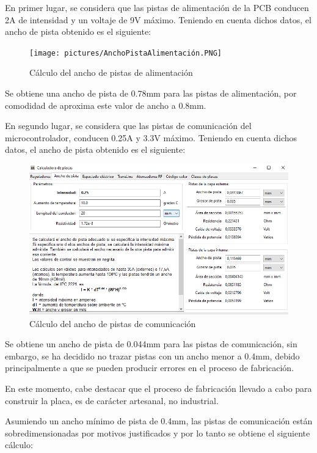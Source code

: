 En primer lugar, se considera que las pistas de alimentación de la PCB conducen 2A de intensidad y un voltaje de 9V máximo. Teniendo en cuenta dichos datos, el ancho de pista obtenido es el siguiente:

\begin{figure}[H]
\centering 
\texttt{[image: pictures/AnchoPistaAlimentación.PNG]}
\caption{Cálculo del ancho de pistas de alimentación}
\label{fig:kdiagram}
\end{figure}
 
 Se obtiene una ancho de pista de 0.78mm para las pistas de alimentación, por comodidad de aproxima este valor de ancho a 0.8mm.
 
 En segundo lugar, se considera que las pistas de comunicación del microcontrolador, conducen 0.25A y 3.3V máximo. Teniendo en cuenta dichos datos, el ancho de pista obtenido es el siguiente:
 
\begin{figure}[H]
\centering 
\includegraphics[width=0.9\linewidth]{pictures/AnchoPistaRestoMinimo.PNG}
\caption{Cálculo del ancho de pistas de comunicación}
\label{fig:kdiagram}
\end{figure}

Se obtiene un ancho de pista de 0.044mm para las pistas de comunicación, sin embargo, se ha decidido no trazar pistas con un ancho menor a 0.4mm, debido principalmente a que se pueden producir errores en el proceso de fabricación.

En este momento, cabe destacar que el proceso de fabricación llevado a cabo para construir la placa, es de carácter artesanal, no industrial.

Asumiendo un ancho mínimo de pista de 0.4mm, las pistas de comunicación están sobredimensionadas por motivos justificados y por lo tanto se obtiene el siguiente cálculo:

